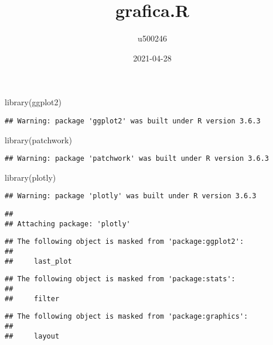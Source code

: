 \documentclass[
]{article}
\title{grafica.R}
\author{u500246}
\date{2021-04-28}
\newenvironment{Shaded}{\begin{snugshade}}{\end{snugshade}}
\newcommand{\FunctionTok}[1]{\textcolor[rgb]{0.00,0.00,0.00}{#1}}
\newcommand{\NormalTok}[1]{#1}
\begin{document}
\maketitle

\begin{Shaded}
\begin{Highlighting}[]
\FunctionTok{library}\NormalTok{(ggplot2)}
\end{Highlighting}
\end{Shaded}

\begin{verbatim}
## Warning: package 'ggplot2' was built under R version 3.6.3
\end{verbatim}

\begin{Shaded}
\begin{Highlighting}[]
\FunctionTok{library}\NormalTok{(patchwork)}
\end{Highlighting}
\end{Shaded}

\begin{verbatim}
## Warning: package 'patchwork' was built under R version 3.6.3
\end{verbatim}

\begin{Shaded}
\begin{Highlighting}[]
\FunctionTok{library}\NormalTok{(plotly)}
\end{Highlighting}
\end{Shaded}

\begin{verbatim}
## Warning: package 'plotly' was built under R version 3.6.3
\end{verbatim}

\begin{verbatim}
## 
## Attaching package: 'plotly'
\end{verbatim}

\begin{verbatim}
## The following object is masked from 'package:ggplot2':
## 
##     last_plot
\end{verbatim}

\begin{verbatim}
## The following object is masked from 'package:stats':
## 
##     filter
\end{verbatim}

\begin{verbatim}
## The following object is masked from 'package:graphics':
## 
##     layout
\end{verbatim}
\end{document}
